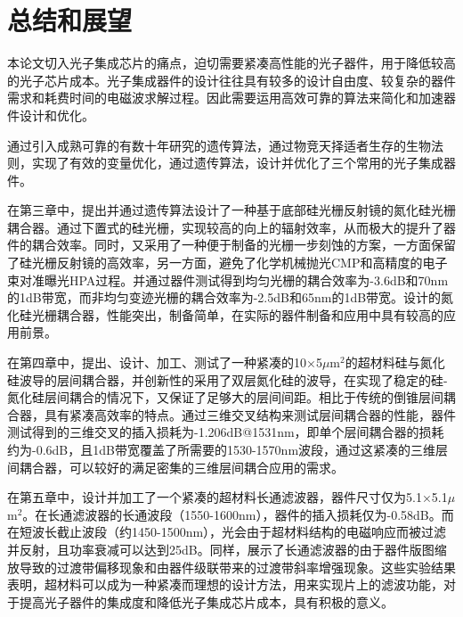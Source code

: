 \chapter{总结和展望}\label{chap:6}

本论文切入光子集成芯片的痛点，迫切需要紧凑高性能的光子器件，用于降低较高的光子芯片成本。光子集成器件的设计往往具有较多的设计自由度、较复杂的器件需求和耗费时间的电磁波求解过程。因此需要运用高效可靠的算法来简化和加速器件设计和优化。

通过引入成熟可靠的有数十年研究的遗传算法，通过物竞天择适者生存的生物法则，实现了有效的变量优化，通过遗传算法，设计并优化了三个常用的光子集成器件。

在第三章中，提出并通过遗传算法设计了一种基于底部硅光栅反射镜的氮化硅光栅耦合器。通过下置式的硅光栅，实现较高的向上的辐射效率，从而极大的提升了器件的耦合效率。同时，又采用了一种便于制备的光栅一步刻蚀的方案，一方面保留了硅光栅反射镜的高效率，另一方面，避免了化学机械抛光CMP和高精度的电子束对准曝光HPA过程。并通过器件测试得到均匀光栅的耦合效率为-3.6dB和70nm的1dB带宽，而非均匀变迹光栅的耦合效率为-2.5dB和65nm的1dB带宽。设计的氮化硅光栅耦合器，性能突出，制备简单，在实际的器件制备和应用中具有较高的应用前景。
 
在第四章中，提出、设计、加工、测试了一种紧凑的10×5$\mu$m$^2$的超材料硅与氮化硅波导的层间耦合器，并创新性的采用了双层氮化硅的波导，在实现了稳定的硅-氮化硅层间耦合的情况下，又保证了足够大的层间间距。相比于传统的倒锥层间耦合器，具有紧凑高效率的特点。通过三维交叉结构来测试层间耦合器的性能，器件测试得到的三维交叉的插入损耗为-1.206dB@1531nm，即单个层间耦合器的损耗约为-0.6dB，且1dB带宽覆盖了所需要的1530-1570nm波段，通过这紧凑的三维层间耦合器，可以较好的满足密集的三维层间耦合应用的需求。

在第五章中，设计并加工了一个紧凑的超材料长通滤波器，器件尺寸仅为5.1×5.1$\mu$m$^2$。在长通滤波器的长通波段（1550-1600nm），器件的插入损耗仅为-0.58dB。而在短波长截止波段（约1450-1500nm），光会由于超材料结构的电磁响应而被过滤并反射，且功率衰减可以达到25dB。同样，展示了长通滤波器的由于器件版图缩放导致的过渡带偏移现象和由器件级联带来的过渡带斜率增强现象。这些实验结果表明，超材料可以成为一种紧凑而理想的设计方法，用来实现片上的滤波功能，对于提高光子器件的集成度和降低光子集成芯片成本，具有积极的意义。

